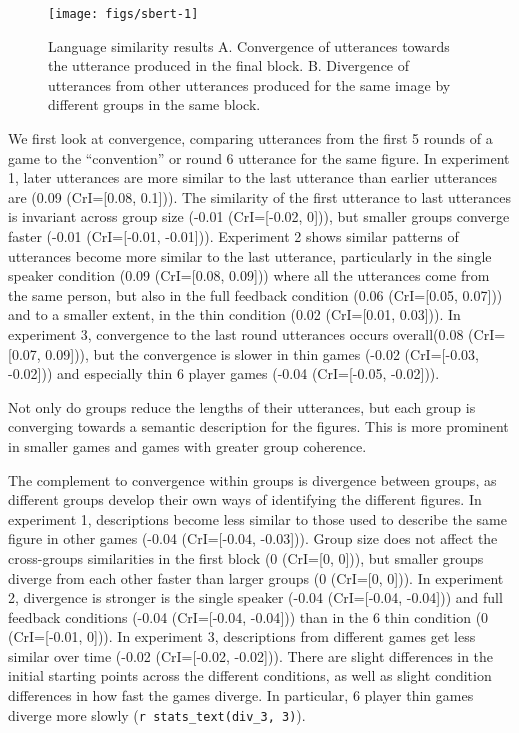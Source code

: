 \documentclass[
  english,
  a4paper,
]{article}
\begin{document}
\begin{figure*}[t!]

{\centering \texttt{[image: figs/sbert-1]} 

}

\caption{Language similarity results A. Convergence of utterances towards the utterance produced in the final block. B. Divergence of utterances from other utterances produced for the same image by different groups in the same block. }\label{fig:sbert}
\end{figure*}

We first look at convergence, comparing utterances from the first 5 rounds of a game to the ``convention'' or round 6 utterance for the same figure. In experiment 1, later utterances are more similar to the last utterance than earlier utterances are (0.09 (CrI={[}0.08, 0.1{]})). The similarity of the first utterance to last utterances is invariant across group size (-0.01 (CrI={[}-0.02, 0{]})), but smaller groups converge faster (-0.01 (CrI={[}-0.01, -0.01{]})). Experiment 2 shows similar patterns of utterances become more similar to the last utterance, particularly in the single speaker condition (0.09 (CrI={[}0.08, 0.09{]})) where all the utterances come from the same person, but also in the full feedback condition (0.06 (CrI={[}0.05, 0.07{]})) and to a smaller extent, in the thin condition (0.02 (CrI={[}0.01, 0.03{]})). In experiment 3, convergence to the last round utterances occurs overall(0.08 (CrI={[}0.07, 0.09{]})), but the convergence is slower in thin games (-0.02 (CrI={[}-0.03, -0.02{]})) and especially thin 6 player games (-0.04 (CrI={[}-0.05, -0.02{]})).

Not only do groups reduce the lengths of their utterances, but each group is converging towards a semantic description for the figures. This is more prominent in smaller games and games with greater group coherence.

The complement to convergence within groups is divergence between groups, as different groups develop their own ways of identifying the different figures. In experiment 1, descriptions become less similar to those used to describe the same figure in other games (-0.04 (CrI={[}-0.04, -0.03{]})). Group size does not affect the cross-groups similarities in the first block (0 (CrI={[}0, 0{]})), but smaller groups diverge from each other faster than larger groups (0 (CrI={[}0, 0{]})). In experiment 2, divergence is stronger is the single speaker (-0.04 (CrI={[}-0.04, -0.04{]})) and full feedback conditions (-0.04 (CrI={[}-0.04, -0.04{]})) than in the 6 thin condition (0 (CrI={[}-0.01, 0{]})). In experiment 3, descriptions from different games get less similar over time (-0.02 (CrI={[}-0.02, -0.02{]})). There are slight differences in the initial starting points across the different conditions, as well as slight condition differences in how fast the games diverge. In particular, 6 player thin games diverge more slowly (\texttt{r\ stats\_text(div\_3,\ 3)}).
\end{document}

